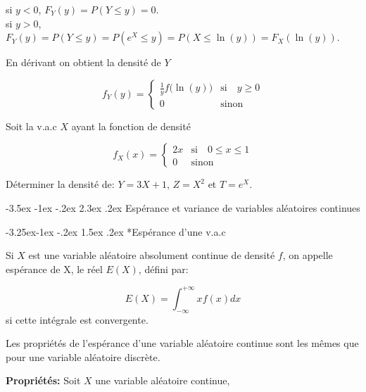 \documentclass[]{book}
\makeatletter
\renewcommand\section{\@startsection {section}{1}{\z@}%
                                   {-3.5ex \@plus -1ex \@minus -.2ex}%
                                   {2.3ex \@plus.2ex}%
                                   {\normalfont\Large\bfseries\color{ForestGreen}}}
\renewcommand\subsection{\@startsection{subsection}{2}{\z@}%
                                     {-3.25ex\@plus -1ex \@minus -.2ex}%
                                     {1.5ex \@plus .2ex}%
                                     {\normalfont\large\bfseries\color{Violet}}}
\theoremstyle{magentacolor}
\theoremstyle{proprie}
\theoremstyle{exstyle}
\theoremstyle{exostyle}
\theoremstyle{definition}
\theoremstyle{definition}
\theoremstyle{definition}
\theoremstyle{remark}
\let\BeginKnitrBlock\begin \let\EndKnitrBlock\end
\makeatother
\begin{document}
si \(y<0\), \(F_Y(y) = P(Y\leq y)=0\).\\
si \(y>0\),
\(F_Y(y) = P(Y\leq y)=P(e^X \le y)=P( X \leq \ln (y))=F_X(\ln(y))\).

En dérivant on obtient la densité de \(Y\)

\[f_Y(y)= \left\lbrace
      \begin{array}{ll}
      \frac{1}{y} f\big(\ln (y)\big)  & \mbox{si} \quad y \ge 0\\
      0 & \mbox{sinon}
      \end{array}
  \right.\]

\BeginKnitrBlock{rmdexercise}
Soit la v.a.c \(X\) ayant la
fonction de densité

\[f_X(x)= \left\lbrace
      \begin{array}{ll}
      2 x   & \mbox{si} \quad 0 \le x \le 1\\
      0 & \mbox{sinon}
      \end{array}
  \right.\]

Déterminer la densité de: \(Y=3X+1\), \(Z=X^2\) et \(T=e^X\).
\EndKnitrBlock{rmdexercise}

\hypertarget{esperance-et-variance-de-variables-aleatoires-continues}{%
\section{Espérance et variance de variables aléatoires continues}\label{esperance-et-variance-de-variables-aleatoires-continues}}

\hypertarget{esperance-dune-v.a.c}{%
\subsection*{Espérance d'une v.a.c}\label{esperance-dune-v.a.c}}

\BeginKnitrBlock{definition}
\protect\hypertarget{def:unnamed-chunk-38}{}{\label{def:unnamed-chunk-38} }Si \(X\) est une variable aléatoire absolument continue de densité \(f\), on
appelle espérance de X, le réel \(E(X)\), défini par:

\[E(X)= \int_{-\infty}^{+\infty}x f(x) dx\] si cette intégrale est
convergente.
\EndKnitrBlock{definition}

Les propriétés de l'espérance d'une variable aléatoire continue sont les
mêmes que pour une variable aléatoire discrète.

\textbf{Propriétés:} Soit \(X\) une variable aléatoire continue,
\end{document}
